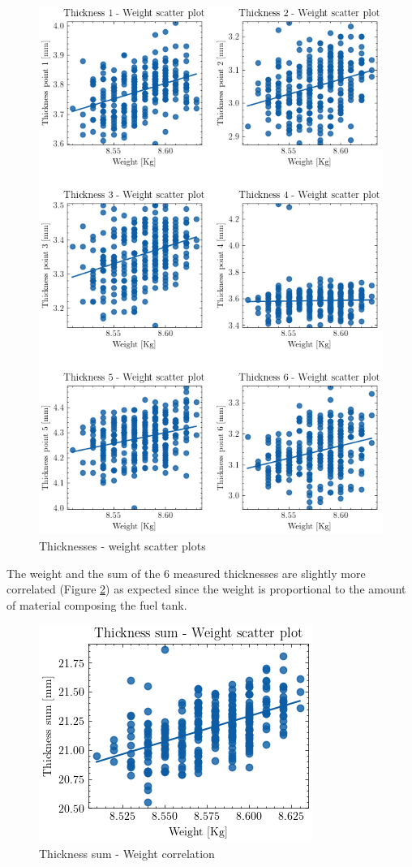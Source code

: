 \begin{figure}
\centering
\includegraphics[scale=0.9]{images/chapter_4/thickness_weight.png}
\caption{Thicknesses - weight scatter plots}
\label{fig:thicknesses_weight_scatter}
\end{figure}
%
The weight and the sum of the 6 measured thicknesses are slightly more correlated (Figure \ref{fig:thickness_sum_weight_correlation}) as expected since the weight is proportional to the amount of material composing the fuel tank.
%
\begin{figure}
\centering
\includegraphics[scale=1]{images/chapter_4/thickness_sum_weight.png}
\caption{Thickness sum - Weight correlation}
\label{fig:thickness_sum_weight_correlation}
\end{figure}
